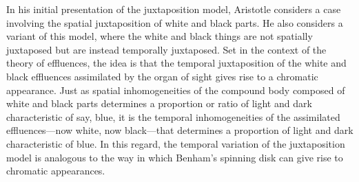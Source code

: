 
In his initial presentation of the juxtaposition model, Aristotle considers a case involving the spatial juxtaposition of white and black parts. He also considers a variant of this model, where the white and black things are not spatially juxtaposed but are instead temporally juxtaposed. Set in the context of the theory of effluences, the idea is that the temporal juxtaposition of the white and black effluences assimilated by the organ of sight gives rise to a chromatic appearance. Just as spatial inhomogeneities of the compound body composed of white and black parts determines a proportion or ratio of light and dark characteristic of say, blue, it is the temporal inhomogeneities of the assimilated effluences---now white, now black---that determines a proportion of light and dark characteristic of blue. In this regard, the temporal variation of the juxtaposition model is analogous to the way in which Benham's spinning disk can give rise to chromatic appearances.

